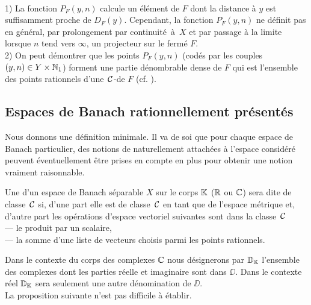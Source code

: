 \begin{fremarks}\label{f253}~\\
1)	La fonction  $P_F(y,n)$  calcule un élément de  $F$  dont la distance 
à  $y$  est suffisamment proche de  $D_F(y)$. Cependant, la fonction  
$P_F(y,n)$  ne définit pas en général, par prolongement par continuité~à~$X$ et par passage à la limite lorsque  $n$  tend vers  $\infty$, un 
projecteur sur le fermé $F$. \\
2)	On peut démontrer que les points  $P_F(y,n)$  (codés par les couples  $(y,n) 
\in  Y \times  \mathbb {N}_1$)  forment une partie dénombrable dense de  $F$  qui est 
l'ensemble des points rationnels d'une~${{\cal C}}$-\pres de  $F$  (cf. \cite{fMo}).
\end{fremarks}


\subsection{Espaces de Banach rationnellement présentés}\label{fsubsec26}
Nous donnons une définition minimale. Il va de soi que pour chaque espace de Banach particulier, des notions de \com naturellement attachées à l'espace considéré peuvent éventuellement être prises en compte en plus pour obtenir une notion vraiment raisonnable. 

\begin{fdefinition}\label{f261} 
Une \rp  d'un espace de Banach séparable $X$ sur le corps  $\mathbb {K}$  ($\mathbb {R}$  ou $\mathbb {C}$) sera dite de classe~${{\cal C}}$ si, d'une part elle est de classe~${{\cal C}}$  en tant que \pres de l'espace métrique et, d'autre part les opérations 
d'espace vectoriel suivantes sont dans la classe~${{\cal C}}$\\  
--- le produit par un scalaire,\\ 
--- la somme d'une liste de vecteurs choisis parmi les points rationnels.
\end{fdefinition}

Dans le contexte du corps des complexes  $\mathbb {C}$  nous désignerons par  
$\mathbb {D}_\mathbb {K}$  l'ensemble des complexes dont les parties réelle et imaginaire 
sont dans  $\DD$. Dans le contexte réel  $\mathbb {D}_\mathbb {K}$  sera seulement une 
autre dénomination de  $\DD$.\\
La proposition suivante n'est pas difficile à établir. 

